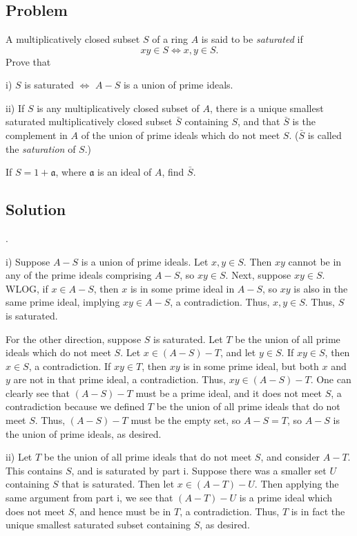 \documentclass[book,12pt,oneside,openany]{memoir}
\begin{document}
\section{}
\subsection{Problem}
A multiplicatively closed subset $S$ of a ring $A$ is said to be \emph{saturated} if \[xy \in S \Leftrightarrow x,y \in S.\]
Prove that 

i) $S$ is saturated $\Leftrightarrow$ $A - S$ is a union of prime ideals.

ii) If $S$ is any multiplicatively closed subset of $A$, there is a unique smallest saturated multiplicatively closed subset $\bar{S}$ containing $S$, and that $\bar{S}$ is the complement in $A$ of the union of prime ideals which do not meet $S$. ($\bar{S}$ is called the \emph{saturation} of $S$.)

If $S = 1 + \mathfrak{a}$, where $\mathfrak{a}$ is an ideal of $A$, find $\bar{S}$.

\subsection{Solution}
.

i) Suppose $A-S$ is a union of prime ideals. Let $x,y \in S$. Then $xy$ cannot be in any of the prime ideals comprising $A-S$, so $xy \in S$. Next, suppose $xy \in S$. WLOG, if $x \in A - S$, then $x$ is in some prime ideal in $A-S$, so $xy $ is also in the same prime ideal, implying $xy \in A - S$, a contradiction. Thus, $x,y \in S$. Thus, $S$ is saturated.

For the other direction, suppose $S$ is saturated. Let $T$ be the union of all prime ideals which do not meet $S$. Let $x \in (A - S) - T$, and let $y \in S$. If $xy \in S$, then $x \in S$, a contradiction. If $xy \in T$, then $xy$ is in some prime ideal, but both $x$ and $y$ are not in that prime ideal, a contradiction. Thus, $xy \in (A-S) - T$. One can clearly see that $(A-S) - T$ must be a prime ideal, and it does not meet $S$, a contradiction because we defined $T$ be the union of all prime ideals that do not meet $S$. Thus, $(A-S)-T$ must be the empty set, so $A-S = T$, so $A-S$ is the union of prime ideals, as desired.

ii) Let $T$ be the union of all prime ideals that do not meet $S$, and consider $A-T$. This contains $S$, and is saturated by part i. Suppose there was a smaller set $U$ containing $S$ that is saturated. Then let $x \in (A-T) - U$. Then applying the same argument from part i, we see that $(A-T) - U$ is a prime ideal which does not meet $S$, and hence must be in $T$, a contradiction. Thus, $T$ is in fact the unique smallest saturated subset containing $S$, as desired.
\end{document}
